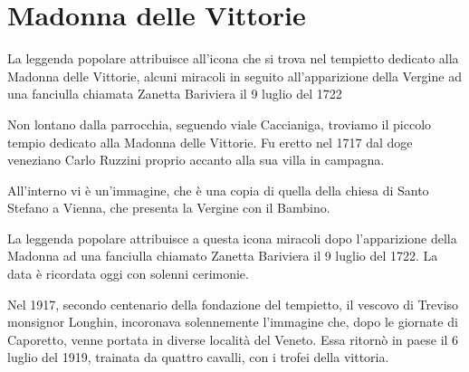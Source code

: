 \section{Madonna delle Vittorie}

La leggenda popolare attribuisce all’icona che si trova nel tempietto dedicato alla Madonna delle Vittorie, alcuni miracoli in seguito all’apparizione della Vergine ad una fanciulla chiamata Zanetta Bariviera il 9 luglio del 1722

Non lontano dalla parrocchia, seguendo viale Caccianiga, troviamo il piccolo tempio dedicato alla Madonna delle Vittorie. Fu eretto nel 1717 dal doge veneziano Carlo Ruzzini proprio accanto alla sua villa in campagna.

All’interno vi è un’immagine, che è una copia di quella della chiesa di Santo Stefano a Vienna, che presenta la Vergine con il Bambino.

La leggenda popolare attribuisce a questa icona miracoli dopo l’apparizione della Madonna ad una fanciulla chiamato Zanetta Bariviera il 9 luglio del 1722. La data è ricordata oggi con solenni cerimonie.

Nel 1917, secondo centenario della fondazione del tempietto, il vescovo di Treviso monsignor Longhin, incoronava solennemente l’immagine che, dopo le giornate di Caporetto, venne portata in diverse località del Veneto. Essa ritornò in paese il 6 luglio del 1919, trainata da quattro cavalli, con i trofei della vittoria.

